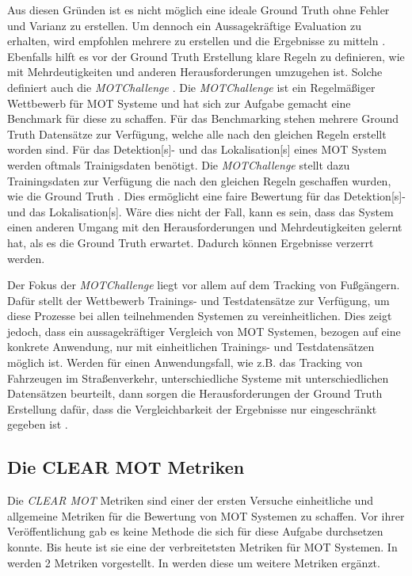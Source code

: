 Aus diesen Gründen ist es nicht möglich eine ideale \gls{Ground Truth} ohne Fehler und Varianz zu erstellen. Um dennoch ein Aussagekräftige Evaluation zu erhalten, wird empfohlen mehrere  zu erstellen und die Ergebnisse zu mitteln \cite{Milan.2013}. Ebenfalls hilft es vor der \gls{Ground Truth} Erstellung klare Regeln zu definieren, wie mit Mehrdeutigkeiten und anderen Herausforderungen umzugehen ist. Solche definiert auch die \textit{MOTChallenge} \cite{MOT16, MOT20}. Die \textit{MOTChallenge} ist ein Regelmäßiger Wettbewerb für \gls{MOT} Systeme und hat sich zur Aufgabe gemacht eine Benchmark für diese zu schaffen. Für das Benchmarking stehen mehrere \gls{Ground Truth} Datensätze zur Verfügung, welche alle nach den gleichen Regeln erstellt worden sind. Für das \gls{Detektion}[s]- und das \gls{Lokalisation}[s] eines \gls{MOT} System werden oftmals Trainigsdaten benötigt. Die \textit{MOTChallenge} stellt dazu Trainingsdaten zur Verfügung die nach den gleichen Regeln geschaffen wurden, wie die \gls{Ground Truth} \cite{MOT16, MOT20}. Dies ermöglicht eine faire Bewertung für das \gls{Detektion}[s]- und das \gls{Lokalisation}[s]. Wäre dies nicht der Fall, kann es sein, dass das System einen anderen Umgang mit den Herausforderungen und Mehrdeutigkeiten gelernt hat, als es die \gls{Ground Truth} erwartet. Dadurch können Ergebnisse verzerrt werden. \par

Der Fokus der \textit{MOTChallenge} liegt vor allem auf dem \gls{Tracking} von Fußgängern. Dafür stellt der Wettbewerb Trainings- und Testdatensätze zur Verfügung, um diese Prozesse bei allen teilnehmenden Systemen zu vereinheitlichen. Dies zeigt jedoch, dass ein aussagekräftiger Vergleich von \gls{MOT} Systemen, bezogen auf eine konkrete Anwendung, nur mit einheitlichen Trainings- und Testdatensätzen möglich ist. Werden für einen Anwendungsfall, wie z.B. das \gls{Tracking} von Fahrzeugen im Straßenverkehr, unterschiedliche Systeme mit unterschiedlichen Datensätzen beurteilt, dann sorgen die Herausforderungen der \gls{Ground Truth} Erstellung dafür, dass die Vergleichbarkeit der Ergebnisse nur eingeschränkt gegeben ist \cite{MOT15}. 

\subsection{Die CLEAR MOT Metriken} \label{sec:MOT MOTA}
Die \textit{\acrshort{CLEAR} \gls{MOT}} Metriken sind einer der ersten Versuche einheitliche und allgemeine Metriken für die Bewertung von \gls{MOT} Systemen zu schaffen. Vor ihrer Veröffentlichung gab es keine Methode die sich für diese Aufgabe durchsetzen konnte. Bis heute ist sie eine der verbreitetsten Metriken für \gls{MOT} Systemen. In \cite{CLEAR.2008} werden 2 Metriken vorgestellt. In \cite{Kasturi.2009} werden diese um weitere Metriken ergänzt. \par

